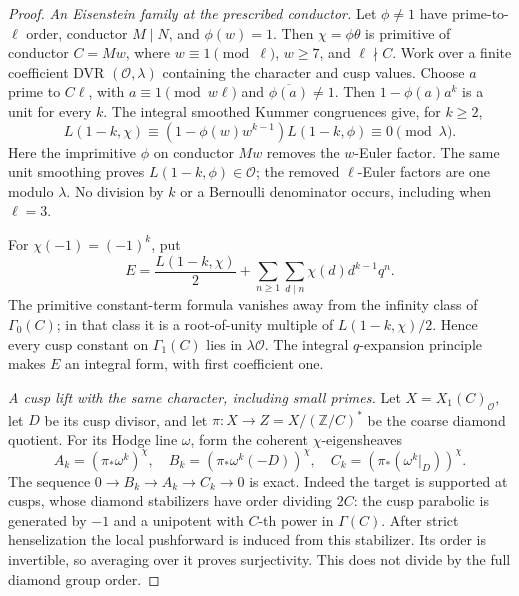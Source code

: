 \begin{proof}
\emph{An Eisenstein family at the prescribed conductor.}
Let \(\phi\ne1\) have prime-to-\(\ell\) order, conductor
\(M\mid N\), and \(\phi(w)=1\).  Then
\(\chi=\phi\theta\) is primitive of conductor \(C=Mw\),
where \(w\equiv1\pmod\ell\), \(w\geq7\), and
\(\ell\nmid C\).  Work over a finite coefficient DVR
\((\mathcal O,\lambda)\) containing the character and cusp values.
Choose \(a\) prime to \(C\ell\), with
\(a\equiv1\pmod{w\ell}\) and \(\overline{\phi(a)}\ne1\).
Then \(1-\phi(a)a^k\) is a unit for every \(k\).
The integral smoothed Kummer congruences
\cite[Main Theorem 8.2]{SeedDeligneRibet} give, for \(k\geq2\),
\[
 L(1-k,\chi)\equiv
 (1-\phi(w)w^{k-1})L(1-k,\phi)\equiv0\pmod\lambda.    \tag{AS2}
\]
Here the imprimitive \(\phi\) on conductor \(Mw\) removes the
\(w\)-Euler factor.  The same unit smoothing proves
\(L(1-k,\phi)\in\mathcal O\); the removed \(\ell\)-Euler
factors are one modulo \(\lambda\).  No division by \(k\) or a
Bernoulli denominator occurs, including when \(\ell=3\).

For \(\chi(-1)=(-1)^k\), put
\[
 E=\frac{L(1-k,\chi)}2+
       \sum_{n\geq1}\sum_{d\mid n}\chi(d)d^{k-1}q^n.
\]
The primitive constant-term formula
\cite[Definition 4.2 and Theorem 4.5(1)]{SeedDasguptaKakde}
vanishes away from the infinity class of \(\Gamma_0(C)\);
in that class it is a root-of-unity multiple of
\(L(1-k,\chi)/2\).  Hence every cusp constant on
\(\Gamma_1(C)\) lies in \(\lambda\mathcal O\).
The integral \(q\)-expansion principle
\cite[Corollary 1.6.2]{SeedKatz} makes \(E\) an integral form,
with first coefficient one.

\emph{A cusp lift with the same character, including small primes.}
Let \(X=X_1(C)_{\mathcal O}\), let \(D\) be its cusp divisor,
and let \(\pi:X\to Z=X/(\mathbb Z/C)^*\) be the coarse diamond
quotient.  For its Hodge line \(\omega\), form the coherent
\(\chi\)-eigensheaves
\[
 A_k=(\pi_*\omega^k)^\chi,\quad
 B_k=(\pi_*\omega^k(-D))^\chi,\quad
 C_k=(\pi_*(\omega^k|_D))^\chi.
\]
The sequence \(0\to B_k\to A_k\to C_k\to0\) is exact.
Indeed the target is supported at cusps, whose diamond stabilizers
have order dividing \(2C\): the cusp parabolic is generated by
\(-1\) and a unipotent with \(C\)-th power in \(\Gamma(C)\).
After strict henselization the local pushforward is induced from this
stabilizer.  Its order is invertible, so averaging over it proves
surjectivity.  This does not divide by the full diamond group order.


\end{proof}
